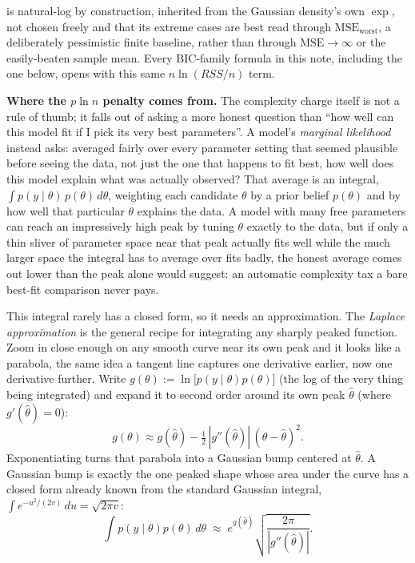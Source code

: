 \documentclass[11pt]{article}
\begin{document}
is natural-log by construction, inherited from the Gaussian density's own
$\exp$, not chosen freely and that its extreme cases are best read
through $\mathrm{MSE}_{\text{worst}}$, a deliberately pessimistic finite
baseline, rather than through $\mathrm{MSE} \to \infty$ or the
easily-beaten sample mean. Every $\mathrm{BIC}$-family formula in this
note, including the one below, opens with this same $n\ln(RSS/n)$ term.

\textbf{Where the $p \ln n$ penalty comes from.} The complexity charge
itself is not a rule of thumb; it falls out of asking a more honest
question than ``how well can this model fit if I pick its very best
parameters''. A model's \emph{marginal likelihood} instead asks: averaged
fairly over every parameter setting that seemed plausible before seeing
the data, not just the one that happens to fit best, how well does this
model explain what was actually observed? That average is an integral,
$\int p(y\mid\theta)\,p(\theta)\,d\theta$, weighting each candidate
$\theta$ by a prior belief $p(\theta)$ and by how well that particular
$\theta$ explains the data. A model with many free parameters can reach
an impressively high peak by tuning $\theta$ exactly to the data, but if
only a thin sliver of parameter space near that peak actually fits well
while the much larger space the integral has to average over fits
badly, the honest average comes out lower than the peak alone would
suggest: an automatic complexity tax a bare best-fit comparison never
pays.

This integral rarely has a closed form, so it needs an approximation.
The \emph{Laplace approximation} is the general recipe for
integrating any sharply peaked function. Zoom in close enough on any
smooth curve near its own peak and it looks like a parabola, the same
idea a tangent line captures one derivative earlier, now one derivative
further. Write $g(\theta) := \ln\!\big[p(y\mid\theta)p(\theta)\big]$ (the
log of the very thing being integrated) and expand it to second order
around its own peak $\hat\theta$ (where $g'(\hat\theta)=0$):
$$g(\theta) \approx g(\hat\theta) - \tfrac12\,|g''(\hat\theta)|\,(\theta-\hat\theta)^2.$$
Exponentiating turns that parabola into a Gaussian bump centered at
$\hat\theta$. A Gaussian bump is exactly the one peaked shape whose
area under the curve has a closed form already known from the standard
Gaussian integral, $\int e^{-u^2/(2v)}\,du = \sqrt{2\pi v}$:
$$\int p(y\mid\theta)p(\theta)\,d\theta \;\approx\;
e^{g(\hat\theta)}\sqrt{\frac{2\pi}{|g''(\hat\theta)|}}.$$
\end{document}
